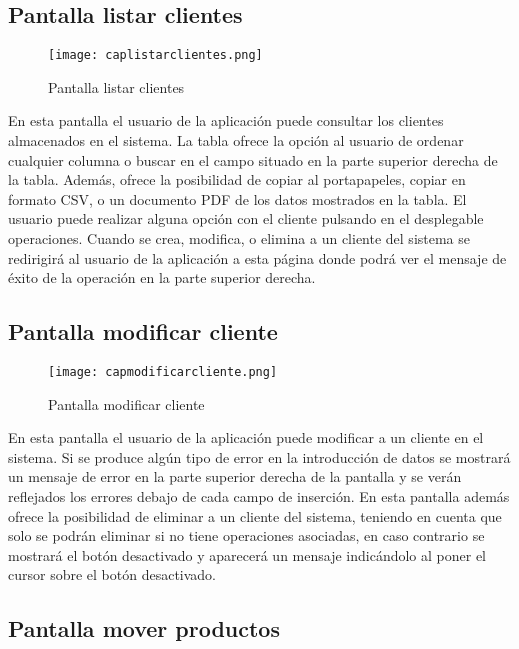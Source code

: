 \subsection {Pantalla listar clientes}

\begin{figure}[!htb]
  \centering
    \texttt{[image: caplistarclientes.png]}
  \caption{Pantalla listar clientes}
  \label{a}
\end{figure}

En esta pantalla el usuario de la aplicación puede consultar los clientes almacenados en el sistema. La tabla ofrece la opción al usuario de ordenar cualquier columna o buscar en el campo situado en la parte superior derecha de la tabla. Además, ofrece la posibilidad de copiar al portapapeles, copiar en formato CSV, o un documento PDF de los datos mostrados en la tabla. El usuario puede realizar alguna opción con el cliente pulsando en el desplegable operaciones. Cuando se crea, modifica, o elimina a un cliente del sistema se redirigirá al usuario de la aplicación a esta página donde podrá ver el mensaje de éxito de la operación en la parte superior derecha.

\newpage
\subsection {Pantalla modificar cliente}

\begin{figure}[!htb]
  \centering
    \texttt{[image: capmodificarcliente.png]}
  \caption{Pantalla modificar cliente}
  \label{a}
\end{figure}

En esta pantalla el usuario de la aplicación puede modificar a un cliente en el sistema. Si se produce algún tipo de error en la introducción de datos se mostrará un mensaje de error en la parte superior derecha de la pantalla y se verán reflejados los errores debajo de cada campo de inserción. En esta pantalla además ofrece la posibilidad de eliminar a un cliente del sistema, teniendo en cuenta que solo se podrán eliminar si no tiene operaciones asociadas, en caso contrario se mostrará el botón desactivado y aparecerá un mensaje indicándolo al poner el cursor sobre el botón desactivado.

\newpage
\subsection {Pantalla mover productos}

